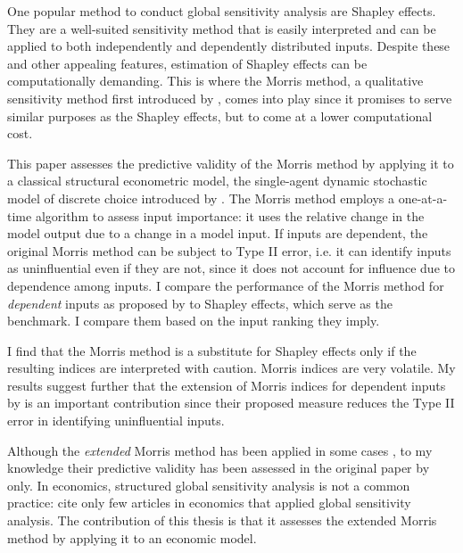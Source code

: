 
One popular method to conduct global sensitivity analysis are Shapley effects. They are a well-suited sensitivity method that is easily interpreted and can be applied to both independently and dependently distributed inputs. Despite these and other appealing features, estimation of Shapley effects can be computationally demanding. This is where the Morris method, a qualitative sensitivity method first introduced by \citet{M91}, comes into play since it promises to serve similar purposes as the Shapley effects, but to come at a lower computational cost.


This paper assesses the predictive validity of the Morris method by applying it to a classical structural econometric model, the single-agent dynamic stochastic model of discrete choice introduced by \citet{R87}. The Morris method employs a one-at-a-time algorithm to assess input importance: it uses the relative change in the model output due to a change in a model input. If inputs are dependent, the original Morris method can be subject to Type II error, i.e. it can identify inputs as uninfluential even if they are not, since it does not account for influence due to dependence among inputs. I compare the performance of the Morris method for \textit{dependent} inputs as proposed by \citet{GM17} to Shapley effects, which serve as the benchmark. I compare them based on the input ranking they imply.

I find that the Morris method is a substitute for Shapley effects only if the resulting indices are interpreted with caution. Morris indices are very volatile. %
My results suggest further that the extension of Morris indices for dependent inputs by \citet{GM17} is an important contribution since their proposed measure reduces the Type II error in identifying uninfluential inputs.

Although the \textit{extended} Morris method has been applied in some cases \citep[e.g.][]{MMA18, RZY19}, to my knowledge their predictive validity has been assessed in the original paper by \citet{GM17} only. In economics, structured global sensitivity analysis is not a common practice: \citet{HMSW19} cite only few articles in economics that applied global sensitivity analysis. The contribution of this thesis is that it assesses the extended Morris method by applying it to an economic model.

